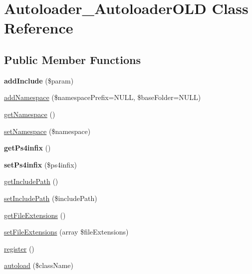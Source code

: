 \hypertarget{class_autoloader___autoloader_o_l_d}{}\section{Autoloader\+\_\+\+Autoloader\+O\+LD Class Reference}
\label{class_autoloader___autoloader_o_l_d}
\subsection*{Public Member Functions}
\begin{DoxyCompactItemize}
\item 
\mbox{\label{class_autoloader___autoloader_o_l_d_ad76880f4dbd1de2f505fc9dc228f3eec}} 
{\bfseries add\+Include} (\$param)
\item 
\mbox{\hyperlink{class_autoloader___autoloader_o_l_d_a0265ffc197e67bd7f169048bc5e3c49d}{add\+Namespace}} (\$namespace\+Prefix=N\+U\+LL, \$base\+Folder=N\+U\+LL)
\item 
\mbox{\hyperlink{class_autoloader___autoloader_o_l_d_a2614df64646ac71b70b1e1074258052b}{get\+Namespace}} ()
\item 
\mbox{\hyperlink{class_autoloader___autoloader_o_l_d_a37949ed2c12b42fb654edc1bac8569ba}{set\+Namespace}} (\$namespace)
\item 
\mbox{\label{class_autoloader___autoloader_o_l_d_a17808d58b1357d852755ff358aa5a255}} 
{\bfseries get\+Ps4infix} ()
\item 
\mbox{\label{class_autoloader___autoloader_o_l_d_aabd960863fc6dbb33b603076acb4c2d6}} 
{\bfseries set\+Ps4infix} (\$ps4infix)
\item 
\mbox{\hyperlink{class_autoloader___autoloader_o_l_d_a621c05f2bef78888deeac9c15e87f0c6}{get\+Include\+Path}} ()
\item 
\mbox{\hyperlink{class_autoloader___autoloader_o_l_d_a24c05c7b3a2132d294fe918e1e64c416}{set\+Include\+Path}} (\$include\+Path)
\item 
\mbox{\hyperlink{class_autoloader___autoloader_o_l_d_acedc0a8c9730ae9acf267a624d8bb5a7}{get\+File\+Extensions}} ()
\item 
\mbox{\hyperlink{class_autoloader___autoloader_o_l_d_a3781873530da3a8721381053da0107a1}{set\+File\+Extensions}} (array \$file\+Extensions)
\item 
\mbox{\hyperlink{class_autoloader___autoloader_o_l_d_acc294a6cc8e69743746820e3d15e3f78}{register}} ()
\item 
\mbox{\hyperlink{class_autoloader___autoloader_o_l_d_a554c5ec3a650c5bf28f6ffa88bc4500a}{autoload}} (\$class\+Name)
\end{DoxyCompactItemize}
